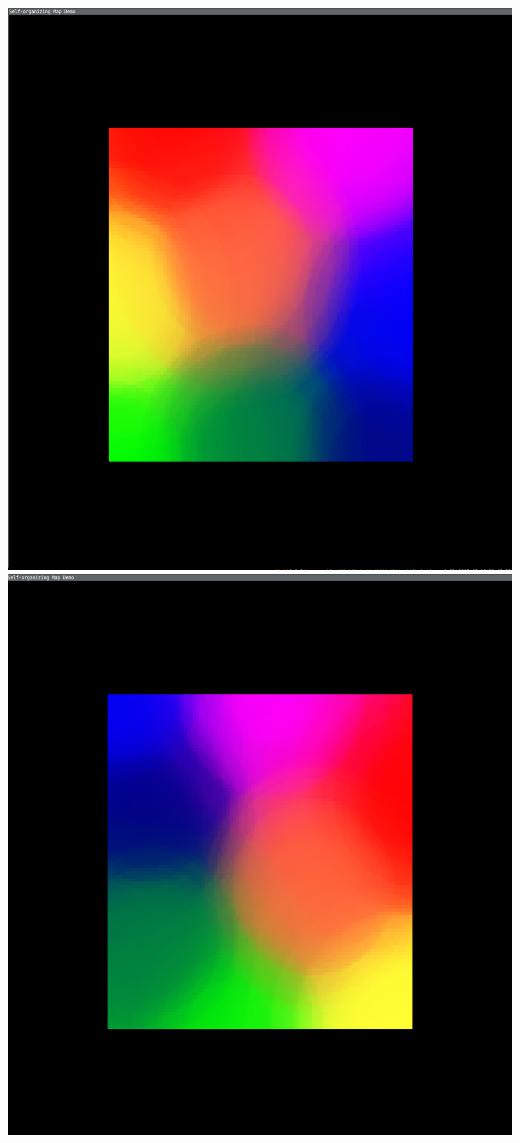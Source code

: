 \documentclass[11pt]{article}
\begin{document}
\includegraphics[scale=.15]{output1}\includegraphics[scale=.1505]{output2}
\end{document}
